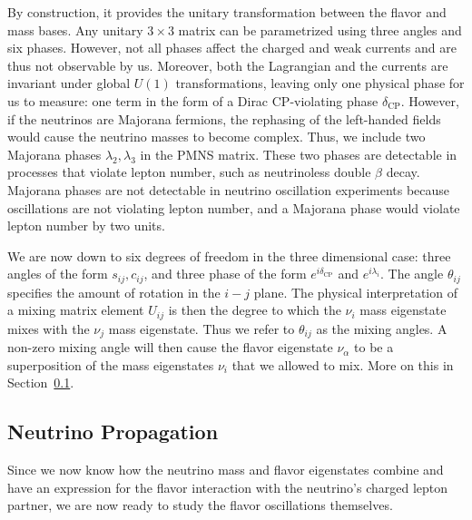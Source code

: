 By construction, it provides the unitary transformation between the flavor and mass bases.
Any unitary $3\times3$ matrix can be parametrized using three angles and six phases. However, not all phases affect the 
charged and weak currents and are thus not observable by us. Moreover, both the Lagrangian and the currents are invariant under global $U(1)$ transformations,
leaving only one physical phase for us to measure: one term in the form of a Dirac CP-violating phase $\delta_\mathrm{CP}$.
However, if the neutrinos are Majorana fermions, the rephasing of the left-handed fields would cause the neutrino masses to become complex.
Thus, we include two Majorana phases $\lambda_{2},\lambda_3$ in the PMNS matrix. These two phases are detectable in processes that violate lepton number, such as neutrinoless double $\beta$ decay.
Majorana phases are not detectable in neutrino oscillation experiments because oscillations are not violating lepton number, and a Majorana phase would
violate lepton number by two units.

We are now down to six degrees of freedom in the three dimensional case: three angles
of the form $s_{ij}, c_{ij}$, and three phase of the form $e^{i\delta_\mathrm{CP}}$ and $e^{i\lambda_{i}}$. The angle $\theta_{ij}$ specifies the amount of rotation in the $i-j$ plane. The physical interpretation of
a mixing matrix element $U_{ij}$ is then the degree to which the $\nu_i$ mass eigenstate mixes with the $\nu_j$ mass eigenstate. Thus we refer to $\theta_{ij}$ as the mixing angles. A non-zero mixing angle will then 
cause the flavor eigenstate $\nu_\alpha$ to be a superposition of the mass eigenstates $\nu_i$ that we allowed to mix. More on this in Section~\ref{sec:prop}.


\subsection{Neutrino Propagation}\label{sec:prop}
Since we now know how the neutrino mass and flavor eigenstates combine and have an expression for the flavor interaction with 
the neutrino's charged lepton partner, we are now ready to study the flavor oscillations themselves.

